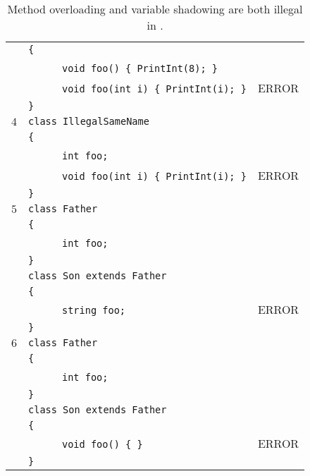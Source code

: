 \documentclass{article}
\begin{document}
\begin{table}[h]
\begin{tabular}{|l|l|l|}
     & \verb"{"                                       &       \\
     & ~ ~ ~ ~\verb"void foo() { PrintInt(8); }"      &       \\
     & ~ ~ ~ ~\verb"void foo(int i) { PrintInt(i); }" & ERROR \\
     & \verb"}"                                       &       \\
\hline
 $4$ & \verb"class IllegalSameName"                   &       \\
     & \verb"{"                                       &       \\
     & ~ ~ ~ ~\verb"int foo;"      &       \\
     & ~ ~ ~ ~\verb"void foo(int i) { PrintInt(i); }" & ERROR \\
     & \verb"}"                                       &       \\
\hline
 $5$ & \verb"class Father"             &       \\
     & \verb"{"                        &       \\
     & ~ ~ ~ ~\verb"int foo;"          &       \\
     & \verb"}"                        &       \\
     & \verb"class Son extends Father" &       \\
     & \verb"{"                        &       \\
     & ~ ~ ~ ~\verb"string foo;"       & ERROR \\
     & \verb"}"                        &       \\
\hline
 $6$ & \verb"class Father"             &       \\
     & \verb"{"                        &       \\
     & ~ ~ ~ ~\verb"int foo;"          &       \\
     & \verb"}"                        &       \\
     & \verb"class Son extends Father" &       \\
     & \verb"{"                        &       \\
     & ~ ~ ~ ~\verb"void foo() { }"       & ERROR \\
     & \verb"}"                        &       \\
\hline
\end{tabular}
\caption{Method overloading and variable shadowing are both illegal in \plname.
\label{Table_Code_Examples_Overload_Override}}
\end{table}
\end{document}
